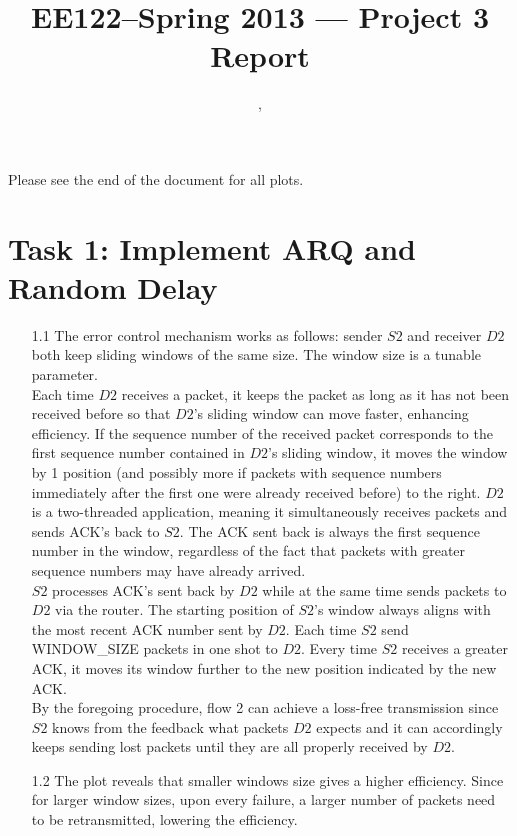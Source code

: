 \documentclass[11pt]{article}
\title{EE122--Spring 2013 --- Project 3 Report}
\author{\Name, \texttt{\Login}}
\begin{document}
    \maketitle
    Please see the end of the document for all plots.\\
 
     
    \section*{Task 1: Implement ARQ and Random Delay}
    
    \begin{itemize}
    \item[1.1]
    The error control mechanism works as follows: sender $S2$ and receiver $D2$ both keep sliding windows of the same size. The window size is a tunable parameter. \\
    Each time $D2$ receives a packet, it keeps the packet as long as it has not been received before so that $D2$'s sliding window can move faster, enhancing efficiency. If the sequence number of the received packet corresponds to the first sequence number contained in $D2$'s sliding window, it moves the window by 1 position (and possibly more if packets with sequence numbers immediately after the first one were already received before) to the right. $D2$ is a two-threaded application, meaning it simultaneously receives packets and sends ACK's back to $S2$. The ACK sent back is always the first sequence number in the window, regardless of the fact that packets with greater sequence numbers may have already arrived. \\
    $S2$ processes ACK's sent back by $D2$ while at the same time sends packets to $D2$ via the router. The starting position of $S2$'s window always aligns with the most recent ACK number sent by $D2$. Each time $S2$ send WINDOW\_SIZE packets in one shot to $D2$. Every time $S2$ receives a greater ACK, it moves its window further to the new position indicated by the new ACK.\\
    By the foregoing procedure, flow 2 can achieve a loss-free transmission since $S2$ knows from the feedback what packets $D2$ expects and it can accordingly keeps sending lost packets until they are all properly received by $D2$.
    
    \item[1.2]
    The plot reveals that smaller windows size gives a higher efficiency. Since for larger window sizes, upon every failure, a larger number of packets need to be retransmitted, lowering the efficiency.
    

\end{itemize}
\end{document}
